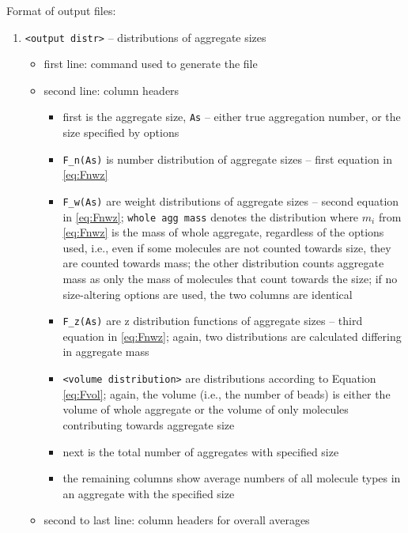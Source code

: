 \noindent
Format of output files:
\begin{enumerate}[nosep,leftmargin=20pt]
  \item \texttt{<output distr>} -- distributions of aggregate sizes
    \begin{itemize}[nosep,leftmargin=5pt]
      \item first line: command used to generate the file
      \item second line: column headers
        \begin{itemize}[nosep,leftmargin=10pt]
          \item first is the aggregate size, \texttt{As} -- either true aggregation
            number, or the size specified by options
          \item \texttt{F\_n(As)} is number distribution of aggregate sizes
            -- first equation in \eqref{eq:Fnwz}
          \item \texttt{F\_w(As)} are weight distributions of aggregate sizes
            -- second equation in \eqref{eq:Fnwz}; \texttt{whole agg mass}
            denotes the distribution where $m_i$ from \eqref{eq:Fnwz} is
            the mass of whole aggregate, regardless of the options used,
            i.e., even if some molecules are not counted towards size, they
            are counted towards mass; the other distribution counts
            aggregate mass as only the mass of molecules that count towards
            the size; if no size-altering options are used, the two columns
            are identical
          \item \texttt{F\_z(As)} are z distribution functions of aggregate
            sizes -- third equation in \eqref{eq:Fnwz}; again, two
            distributions are calculated differing in aggregate mass
          \item \texttt{<volume distribution>} are distributions according
            to Equation \eqref{eq:Fvol}; again, the volume (i.e., the
            number of beads) is either the volume of whole aggregate or the
            volume of only molecules contributing towards aggregate size
          \item next is the total number of aggregates with specified size
          \item the remaining columns show average numbers of all molecule
            types in an aggregate with the specified size
        \end{itemize}
      \item second to last line: column headers for overall averages

\end{itemize}
\end{enumerate}
